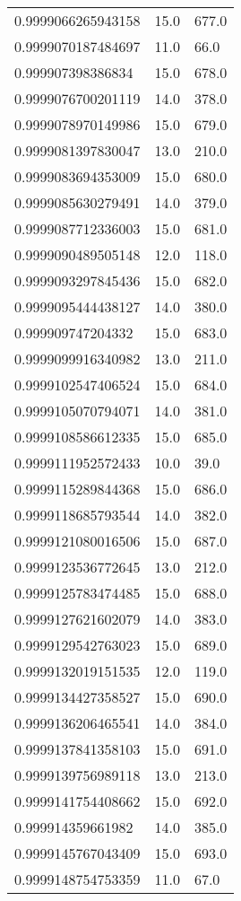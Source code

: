 \begin{center}
\begin{supertabular}[H]{p{0.30\textwidth}p{0.05\textwidth}p{0.05\textwidth}}
0.9999066265943158 & 15.0 & 677.0 \\ 
0.9999070187484697 & 11.0 & 66.0 \\ 
0.999907398386834 & 15.0 & 678.0 \\ 
0.9999076700201119 & 14.0 & 378.0 \\ 
0.9999078970149986 & 15.0 & 679.0 \\ 
0.9999081397830047 & 13.0 & 210.0 \\ 
0.9999083694353009 & 15.0 & 680.0 \\ 
0.9999085630279491 & 14.0 & 379.0 \\ 
0.9999087712336003 & 15.0 & 681.0 \\ 
0.9999090489505148 & 12.0 & 118.0 \\ 
0.9999093297845436 & 15.0 & 682.0 \\ 
0.9999095444438127 & 14.0 & 380.0 \\ 
0.999909747204332 & 15.0 & 683.0 \\ 
0.9999099916340982 & 13.0 & 211.0 \\ 
0.9999102547406524 & 15.0 & 684.0 \\ 
0.9999105070794071 & 14.0 & 381.0 \\ 
0.9999108586612335 & 15.0 & 685.0 \\ 
0.9999111952572433 & 10.0 & 39.0 \\ 
0.9999115289844368 & 15.0 & 686.0 \\ 
0.9999118685793544 & 14.0 & 382.0 \\ 
0.9999121080016506 & 15.0 & 687.0 \\ 
0.9999123536772645 & 13.0 & 212.0 \\ 
0.9999125783474485 & 15.0 & 688.0 \\ 
0.9999127621602079 & 14.0 & 383.0 \\ 
0.9999129542763023 & 15.0 & 689.0 \\ 
0.9999132019151535 & 12.0 & 119.0 \\ 
0.9999134427358527 & 15.0 & 690.0 \\ 
0.9999136206465541 & 14.0 & 384.0 \\ 
0.9999137841358103 & 15.0 & 691.0 \\ 
0.9999139756989118 & 13.0 & 213.0 \\ 
0.9999141754408662 & 15.0 & 692.0 \\ 
0.999914359661982 & 14.0 & 385.0 \\ 
0.9999145767043409 & 15.0 & 693.0 \\ 
0.9999148754753359 & 11.0 & 67.0 \\ 

\end{supertabular}
\end{center}
